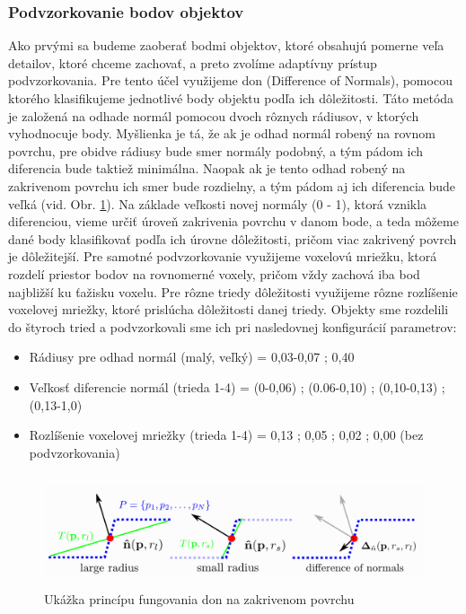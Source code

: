 \subsubsection{Podvzorkovanie bodov objektov}
\noindent Ako prvými sa budeme zaoberať bodmi objektov, ktoré obsahujú pomerne veľa detailov, ktoré chceme zachovať, a preto zvolíme adaptívny prístup podvzorkovania.
\newline\indent Pre tento účel využijeme \acrshort{don} (Difference of Normals), pomocou ktorého klasifikujeme jednotlivé body objektu podľa ich dôležitosti. Táto metóda je založená na odhade normál pomocou dvoch rôznych rádiusov, v ktorých vyhodnocuje body. Myšlienka je tá, že ak je odhad normál robený na rovnom povrchu, pre obidve rádiusy bude smer normály podobný, a tým pádom ich diferencia bude taktiež minimálna. Naopak ak je tento odhad robený na zakrivenom povrchu ich smer bude rozdielny, a tým pádom aj ich diferencia bude veľká (vid. Obr. \ref{fig:Don_principle}). Na základe veľkosti novej normály (0 - 1), ktorá vznikla diferenciou, vieme určiť úroveň zakrivenia povrchu v danom bode, a teda môžeme dané body klasifikovať podľa ich úrovne dôležitosti, pričom viac zakrivený povrch je dôležitejší.
\newline\indent Pre samotné podvzorkovanie využijeme voxelovú mriežku, ktorá rozdelí priestor bodov na rovnomerné voxely, pričom vždy zachová iba bod najbližší ku ťažisku voxelu. Pre rôzne triedy dôležitosti využijeme rôzne rozlíšenie voxelovej mriežky, ktoré prislúcha dôležitosti danej triedy. Objekty sme rozdelili do štyroch tried a podvzorkovali sme ich pri nasledovnej konfigurácií parametrov:

\begin{itemize}
  \setlength\itemsep{0.2em}
  \item Rádiusy pre odhad normál (malý, veľký) = 0,03-0,07 ; 0,40
  \item Veľkosť diferencie normál (trieda 1-4) = (0-0,06) ; (0.06-0,10) ; (0,10-0,13) ; (0,13-1,0)
  \item Rozlíšenie voxelovej mriežky (trieda 1-4) = 0,13 ; 0,05 ; 0,02 ; 0,00 (bez podvzorkovania)
\end{itemize}

\begin{figure}[!htbp]
  \centering
  \includegraphics[width=15cm, height=3.3cm]{img/Don_principle.png}
  \caption{Ukážka princípu fungovania \acrshort{don} na zakrivenom povrchu \cite{DoN_segmentation}} 
  \label{fig:Don_principle}
\end{figure} 

